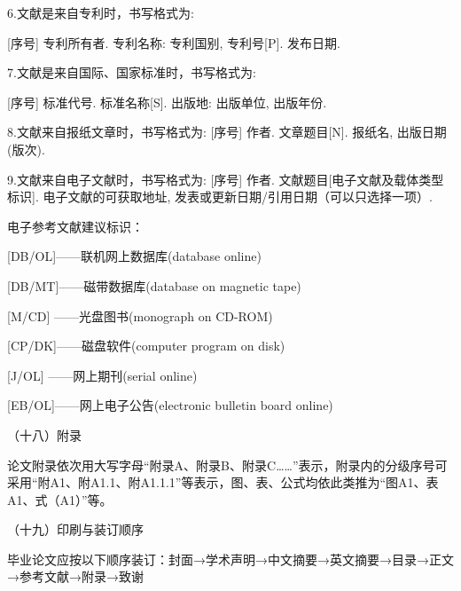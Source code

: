 6.文献是来自专利时，书写格式为:

[序号] 专利所有者. 专利名称: 专利国别, 专利号[P]. 发布日期.

7.文献是来自国际、国家标准时，书写格式为: 

[序号] 标准代号. 标准名称[S]. 出版地: 出版单位, 出版年份.

8.文献来自报纸文章时，书写格式为: 
[序号] 作者. 文章题目[N]. 报纸名, 出版日期(版次).

9.文献来自电子文献时，书写格式为: 
[序号] 作者. 文献题目[电子文献及载体类型标识]. 电子文献的可获取地址, 发表或更新日期/引用日期（可以只选择一项）.

电子参考文献建议标识：

[DB/OL]——联机网上数据库(database online)

[DB/MT]——磁带数据库(database on magnetic tape)

[M/CD] ——光盘图书(monograph on CD-ROM)

[CP/DK]——磁盘软件(computer program on disk)

[J/OL] ——网上期刊(serial online)

[EB/OL]——网上电子公告(electronic bulletin board online)

（十八）附录

论文附录依次用大写字母“附录A、附录B、附录C……”表示，附录内的分级序号可采用“附A1、附A1.1、附A1.1.1”等表示，图、表、公式均依此类推为“图A1、表A1、式（A1）”等。

（十九）印刷与装订顺序

毕业论文应按以下顺序装订：封面→学术声明→中文摘要→英文摘要→目录→正文→参考文献→附录→致谢
